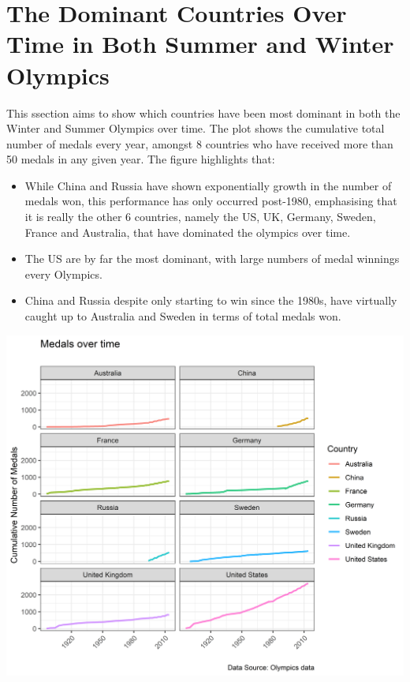 \documentclass[11pt,preprint, authoryear]{elsarticle}
\let\origfigure\figure
\let\endorigfigure\endfigure
\renewenvironment{figure}[1][2] {
    \expandafter\origfigure\expandafter[H]
} {
    \endorigfigure
}
\numberwithin{equation}{section}
\numberwithin{figure}{section}
\numberwithin{table}{section}
\begin{document}
\newpage

\hypertarget{the-dominant-countries-over-time-in-both-summer-and-winter-olympics}{%
\section{\texorpdfstring{The Dominant Countries Over Time in Both Summer
and Winter Olympics
\label{dominate}}{The Dominant Countries Over Time in Both Summer and Winter Olympics }}\label{the-dominant-countries-over-time-in-both-summer-and-winter-olympics}}

This ssection aims to show which countries have been most dominant in
both the Winter and Summer Olympics over time. The plot shows the
cumulative total number of medals every year, amongst 8 countries who
have received more than 50 medals in any given year. The figure
highlights that:

\begin{itemize}
\item
  While China and Russia have shown exponentially growth in the number
  of medals won, this performance has only occurred post-1980,
  emphasising that it is really the other 6 countries, namely the US,
  UK, Germany, Sweden, France and Australia, that have dominated the
  olympics over time.
\item
  The US are by far the most dominant, with large numbers of medal
  winnings every Olympics.
\item
  China and Russia despite only starting to win since the 1980s, have
  virtually caught up to Australia and Sweden in terms of total medals
  won.
\end{itemize}

\begin{figure}[H]

{\centering \includegraphics{Question_4_files/figure-latex/Figure2-1} 

}

\caption{Dominant Countries Cumulative Performance Over Time \label{Figure2}}\label{fig:Figure2}
\end{figure}
\end{document}
